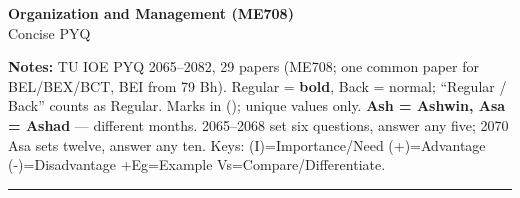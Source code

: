 \documentclass[10pt]{article}
\begin{document}
\begin{center}
  {\large\bfseries Organization and Management (ME708)}\\[0.2em]
  {\normalsize Concise PYQ}
\end{center}
\vspace{-0.4em}
\small
\textbf{Notes:} TU IOE PYQ 2065--2082, 29 papers (ME708; one common paper for BEL/BEX/BCT, BEI from 79 Bh).
Regular = \textbf{bold}, Back = normal; ``Regular / Back'' counts as Regular. Marks in (); unique values only.
\textbf{Ash = Ashwin, Asa = Ashad} --- different months. 2065--2068 set six questions, answer any five; 2070 Asa sets twelve, answer any ten.
Keys: (I)=Importance/Need \quad (+)=Advantage \quad (-)=Disadvantage \quad +Eg=Example \quad Vs=Compare/Differentiate.
\vspace{2pt}
\hrule
\vspace{3pt}
\end{document}

